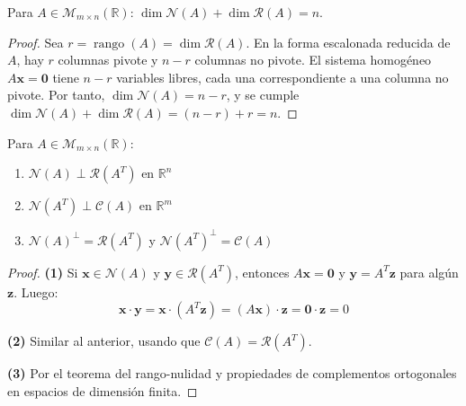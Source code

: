 \begin{theorem} 
Para $A \in \mathcal{M}_{m \times n}(\mathbb{R})$: $\dim \mathcal{N}(A) + \dim \mathcal{R}(A) = n.$
\begin{proof}
Sea $r = \operatorname{rango}(A) = \dim \mathcal{R}(A)$. En la forma escalonada reducida de $A$, hay $r$ columnas pivote y $n-r$ columnas no pivote. El sistema homogéneo $A\mathbf{x} = \mathbf{0}$ tiene $n-r$ variables libres, cada una correspondiente a una columna no pivote. Por tanto, $\dim \mathcal{N}(A) = n-r$, y se cumple $\dim \mathcal{N}(A) + \dim \mathcal{R}(A) = (n-r) + r = n$.
\end{proof}
\end{theorem}

\begin{theorem}
Para $A \in \mathcal{M}_{m \times n}(\mathbb{R})$:
\begin{enumerate}
\item $\mathcal{N}(A) \perp \mathcal{R}(A^T)$ en $\mathbb{R}^n$
\item $\mathcal{N}(A^T) \perp \mathcal{C}(A)$ en $\mathbb{R}^m$
\item $\mathcal{N}(A)^\perp = \mathcal{R}(A^T)$ y $\mathcal{N}(A^T)^\perp = \mathcal{C}(A)$
\end{enumerate}
\begin{proof}
\textbf{(1)} Si $\mathbf{x} \in \mathcal{N}(A)$ y $\mathbf{y} \in \mathcal{R}(A^T)$, entonces $A\mathbf{x} = \mathbf{0}$ y $\mathbf{y} = A^T\mathbf{z}$ para algún $\mathbf{z}$. Luego:
$$\mathbf{x} \cdot \mathbf{y} = \mathbf{x} \cdot (A^T\mathbf{z}) = (A\mathbf{x}) \cdot \mathbf{z} = \mathbf{0} \cdot \mathbf{z} = 0$$

\textbf{(2)} Similar al anterior, usando que $\mathcal{C}(A) = \mathcal{R}(A^T)$.

\textbf{(3)} Por el teorema del rango-nulidad y propiedades de complementos ortogonales en espacios de dimensión finita.
\end{proof}
\end{theorem}

